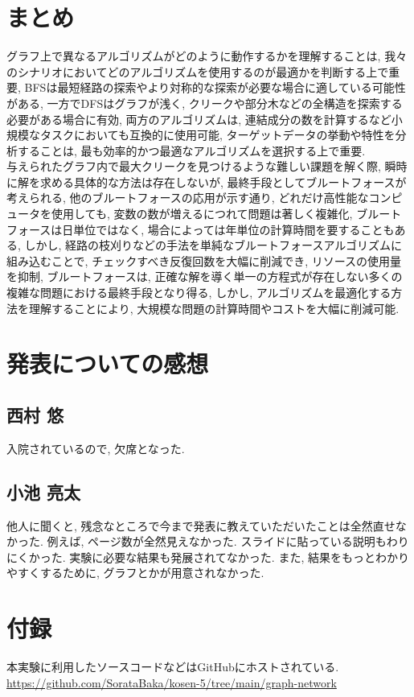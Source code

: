 \documentclass[a4j, 12pt]{jarticle}
\begin{document}
\section{まとめ}
グラフ上で異なるアルゴリズムがどのように動作するかを理解することは, 我々のシナリオにおいてどのアルゴリズムを使用するのが最適かを判断する上で重要, BFSは最短経路の探索やより対称的な探索が必要な場合に適している可能性がある, 一方でDFSはグラフが浅く, クリークや部分木などの全構造を探索する必要がある場合に有効, 両方のアルゴリズムは, 連結成分の数を計算するなど小規模なタスクにおいても互換的に使用可能, ターゲットデータの挙動や特性を分析することは, 最も効率的かつ最適なアルゴリズムを選択する上で重要.\\

与えられたグラフ内で最大クリークを見つけるような難しい課題を解く際, 瞬時に解を求める具体的な方法は存在しないが, 最終手段としてブルートフォースが考えられる, 他のブルートフォースの応用が示す通り, どれだけ高性能なコンピュータを使用しても, 変数の数が増えるにつれて問題は著しく複雑化, ブルートフォースは日単位ではなく, 場合によっては年単位の計算時間を要することもある, しかし, 経路の枝刈りなどの手法を単純なブルートフォースアルゴリズムに組み込むことで, チェックすべき反復回数を大幅に削減でき, リソースの使用量を抑制, ブルートフォースは, 正確な解を導く単一の方程式が存在しない多くの複雑な問題における最終手段となり得る, しかし, アルゴリズムを最適化する方法を理解することにより, 大規模な問題の計算時間やコストを大幅に削減可能.
\section{発表についての感想}
\subsection{西村 悠}
入院されているので, 欠席となった. 
\subsection{小池 亮太}
他人に聞くと, 残念なところで今まで発表に教えていただいたことは全然直せなかった. 例えば, ページ数が全然見えなかった. スライドに貼っている説明もわりにくかった. 実験に必要な結果も発展されてなかった. また, 結果をもっとわかりやすくするために, グラフとかが用意されなかった. 
\section{付録}
本実験に利用したソースコードなどはGitHubにホストされている.
\url{https://github.com/SorataBaka/kosen-5/tree/main/graph-network}


\end{document}
